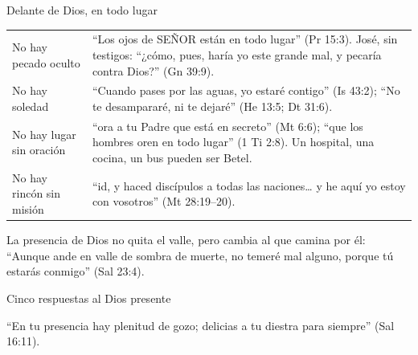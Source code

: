 \documentclass[hyperref={bookmarks=false},aspectratio=169]{beamer}
\newcommand{\SENOR}{S{\fontsize{0.78em}{1em}\selectfont EÑOR}}
\begin{document}
\begin{frame}{Delante de Dios, en todo lugar}
\scriptsize\renewcommand{\arraystretch}{1.2}
\begin{tabular}{@{}>{\RaggedRight\arraybackslash}p{2.6cm}>{\RaggedRight\arraybackslash}p{9.2cm}@{}}
\toprule
No hay pecado oculto & ``Los ojos de \SENOR{} están en todo lugar'' (Pr 15:3). José, sin testigos: ``¿cómo, pues, haría yo este grande mal, y pecaría contra Dios?'' (Gn 39:9). \\
No hay soledad & ``Cuando pases por las aguas, yo estaré contigo'' (Is 43:2); ``No te desampararé, ni te dejaré'' (He 13:5; Dt 31:6). \\
No hay lugar sin oración & ``ora a tu Padre que está en secreto'' (Mt 6:6); ``que los hombres oren en todo lugar'' (1 Ti 2:8). Un hospital, una cocina, un bus pueden ser Betel. \\
No hay rincón sin misión & ``id, y haced discípulos a todas las naciones\ldots{} y he aquí yo estoy con vosotros'' (Mt 28:19--20). \\
\bottomrule
\end{tabular}\par\medskip
\small\RaggedRight La presencia de Dios no quita el valle, pero cambia al que camina por él: ``Aunque ande en valle de sombra de muerte, no temeré mal alguno, porque tú estarás conmigo'' (Sal 23:4).
\end{frame}

\begin{frame}{Cinco respuestas al Dios presente}
\centering
{}\par\medskip
\small\RaggedRight ``En tu presencia hay plenitud de gozo; delicias a tu diestra para siempre'' (Sal 16:11).
\end{frame}
\end{document}

